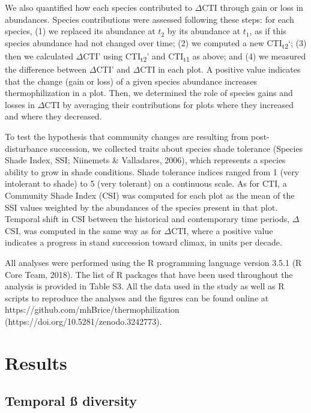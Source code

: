 \documentclass[a4paperpaper,]{article}
\begin{document}
We also quantified how each species contributed to \(\Delta\)CTI through
gain or loss in abundances. Species contributions were assessed
following these steps: for each species, (1) we replaced its abundance
at \(t_2\) by its abundance at \(t_1\), as if this species abundance had
not changed over time; (2) we computed a new CTI\textsubscript{t2}`; (3)
then we calculated \(\Delta\)CTI' using CTI\textsubscript{t2}' and
CTI\textsubscript{t1} as above; and (4) we measured the difference
between \(\Delta\)CTI' and \(\Delta\)CTI in each plot. A positive value
indicates that the change (gain or loss) of a given species abundance
increases thermophilization in a plot. Then, we determined the role of
species gains and losses in \(\Delta\)CTI by averaging their
contributions for plots where they increased and where they decreased.

To test the hypothesis that community changes are resulting from
post-disturbance succession, we collected traits about species shade
tolerance (Species Shade Index, SSI; Niinemets \& Valladares, 2006),
which represents a species ability to grow in shade conditions. Shade
tolerance indices ranged from 1 (very intolerant to shade) to 5 (very
tolerant) on a continuous scale. As for CTI, a Community Shade Index
(CSI) was computed for each plot as the mean of the SSI values weighted
by the abundances of the species present in that plot. Temporal shift in
CSI between the historical and contemporary time periods, \(\Delta\)CSI,
was computed in the same way as for \(\Delta\)CTI, where a positive
value indicates a progress in stand succession toward climax, in units
per decade.

All analyses were performed using the R programming language version
3.5.1 (R Core Team, 2018). The list of R packages that have been used
throughout the analysis is provided in Table S3. All the data used in
the study as well as R scripts to reproduce the analyses and the figures
can be found online at https://github.com/mhBrice/thermophilization
(https://doi.org/10.5281/zenodo.3242773).

\hypertarget{results}{%
\section{Results}\label{results}}

\hypertarget{temporal-uxdf-diversity}{%
\subsection{Temporal ß diversity}\label{temporal-uxdf-diversity}}
\end{document}
